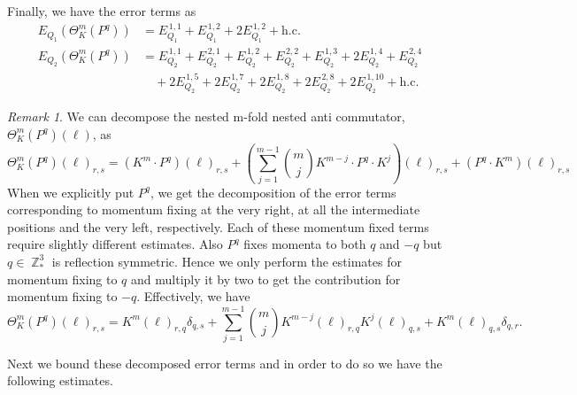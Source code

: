 \documentclass[sn-mathphys, Numbered ,a4paper]{sn-jnl}%
\DeclareMathOperator{\Z}{\mathbb{Z}}
\theoremstyle{plain}
\theoremstyle{definition}
\theoremstyle{remark}
\newtheorem{remark}[theorem]{Remark}
\theoremstyle{plain}
\theoremstyle{definition}
\theoremstyle{remark}
\begin{document}
Finally, we have the error terms as 
\begin{align}
	E_{Q_1}\left(\Theta^m_{K}(P^q)\right)&= E_{Q_1}^{\,1,1} +E_{Q_1}^{\,1,2} +2E_{Q_1}^{\,1,2}  + \mathrm{h.c.}\\
	E_{Q_2}\left(\Theta^m_{K}(P^q)\right)&= E_{Q_2}^{\,1,1} +E_{Q_2}^{\,2,1} + E_{Q_2}^{\,1,2} + E_{Q_2}^{\,2,2} +  E_{Q_2}^{\,1,3} + 2E_{Q_2}^{\,1,4} + E_{Q_2}^{\,2,4}\nonumber\\ &\quad+ 2E_{Q_2}^{\,1,5}+  2E_{Q_2}^{\,1,7} + 2E_{Q_2}^{\,1,8}+ 2E_{Q_2}^{\,2,8}+ 2E_{Q_2}^{\,1,10} + \mathrm{h.c.}
\end{align}
\begin{remark}
We can decompose the nested m-fold nested anti commutator, $\Theta^m_K(P^q)(\ell)$,  as
\begin{equation}
	\Theta^m_K(P^q)(\ell)_{r,s}= \left(K^m\cdot P^q\right)(\ell )_{r,s} +\left(\sum\limits_{j=1}^{m-1} {{m}\choose j}K^{m-j}\cdot P^q\cdot K^{j}\right)(\ell)_{r,s} + \left(P^q\cdot K^m\right)(\ell)_{r,s}
\end{equation}
When we explicitly put $P^q$, we get the decomposition of the error terms corresponding to momentum fixing at the very right, at all the intermediate positions and the very left, respectively. Each of these momentum fixed terms require slightly different estimates. Also $P^q$ fixes momenta to both $q$ and $-q$ but $q \in \Z^3_*$ is reflection symmetric. Hence we only perform the estimates for momentum fixing to $q$ and multiply it by two to get the contribution for momentum fixing to $-q$. Effectively, we have
\begin{equation}
	\Theta^m_K(P^q)(\ell)_{r,s}= K^m(\ell )_{r,q}\delta_{q,s} +\sum\limits_{j=1}^{m-1} {{m}\choose j}K^{m-j}(\ell)_{r,q} K^{j}(\ell)_{q,s} + K^m(\ell)_{q,s}\delta_{q,r}.
\end{equation}
\end{remark}
Next we bound these decomposed error terms and in order to do so we have the following estimates.
\end{document}
